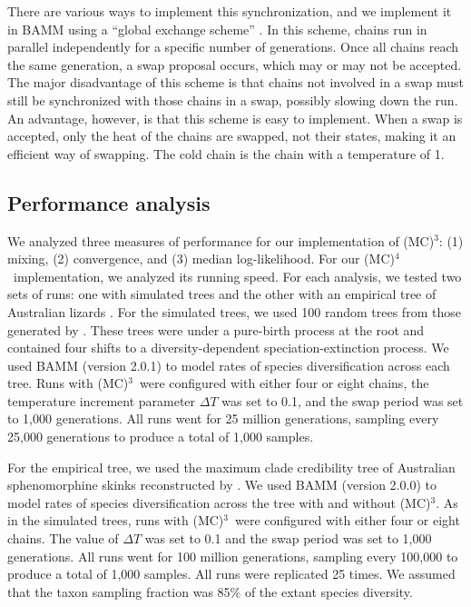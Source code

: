 \documentclass[12pt]{article}
\newcommand{\MCMCMC}{(MC)$^{3}$}
\newcommand{\MCMCMCMC}{(MC)$^{4}$}
\begin{document}
There are various ways to implement this synchronization,
and we implement it in BAMM using a ``global exchange scheme'' \citep{alt04}.
%
In this scheme, chains run in parallel independently
for a specific number of generations.
%
Once all chains reach the same generation, a swap proposal occurs,
which may or may not be accepted.
%
The major disadvantage of this scheme
is that chains not involved in a swap
must still be synchronized with those chains in a swap,
possibly slowing down the run.
%
An advantage, however, is that this scheme is easy to implement.
%
When a swap is accepted, only the heat of the chains are swapped,
not their states, making it an efficient way of swapping.
%
The cold chain is the chain with a temperature of 1.


\subsection*{Performance analysis}

We analyzed three measures of performance for our implementation of \MCMCMC:
(1) mixing, (2) convergence, and (3) median log-likelihood.
%
For our \MCMCMCMC\ implementation, we analyzed its running speed.
%
For each analysis, we tested two sets of runs: one with simulated trees
and the other with an empirical tree of Australian lizards \citep{rab14sysbio}.
%
For the simulated trees, we used 100 random trees
from those generated by \citet{rab14plos}.
%
These trees were under a pure-birth process at the root and
contained four shifts to a diversity-dependent speciation-extinction process.
%
We used BAMM (version 2.0.1) to model rates of species diversification
across each tree.
%
Runs with \MCMCMC\ were configured with either four or eight chains,
the temperature increment parameter $\Delta T$ was set to 0.1,
and the swap period was set to 1,000 generations.
%
All runs went for 25 million generations,
sampling every 25,000 generations to produce a total of 1,000 samples.


For the empirical tree, we used the maximum clade credibility tree
of Australian sphenomorphine skinks reconstructed by \citet{rab14sysbio}.
%
We used BAMM (version 2.0.0) to model rates of species diversification
across the tree with and without \MCMCMC.
%
As in the simulated trees, runs with \MCMCMC\ 
were configured with either four or eight chains.
%
The value of $\Delta T$ was set to 0.1
and the swap period was set to 1,000 generations.
%
All runs went for 100 million generations,
sampling every 100,000 to produce a total of 1,000 samples.
%
All runs were replicated 25 times.
%
We assumed that the taxon sampling fraction was 85\%
of the extant species diversity.
\end{document}
